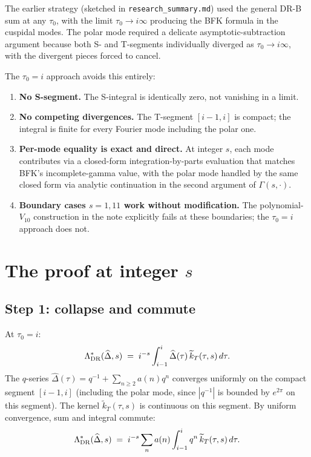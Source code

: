 \documentclass[11pt]{article}
\newcommand{\hatDelta}{\widehat{\Delta}}
\begin{document}
The earlier strategy (sketched in \texttt{research\_summary.md}) used the general DR-B sum at any $\tau_0$, with the limit $\tau_0 \to i\infty$ producing the BFK formula in the cuspidal modes. The polar mode required a delicate asymptotic-subtraction argument because both S- and T-segments individually diverged as $\tau_0 \to i\infty$, with the divergent pieces forced to cancel.

The $\tau_0 = i$ approach avoids this entirely:

\begin{enumerate}
\item \textbf{No S-segment.} The S-integral is identically zero, not vanishing in a limit.
\item \textbf{No competing divergences.} The T-segment $[i-1, i]$ is compact; the integral is finite for every Fourier mode including the polar one.
\item \textbf{Per-mode equality is exact and direct.} At integer $s$, each mode contributes via a closed-form integration-by-parts evaluation that matches BFK's incomplete-gamma value, with the polar mode handled by the same closed form via analytic continuation in the second argument of $\Gamma(s, \cdot)$.
\item \textbf{Boundary cases $s = 1, 11$ work without modification.} The polynomial-$V_{10}$ construction in the note explicitly fails at these boundaries; the $\tau_0 = i$ approach does not.
\end{enumerate}

\section{The proof at integer $s$}

\subsection*{Step 1: collapse and commute}

At $\tau_0 = i$:
\[
\Lambda^*_{\rm DR}(\hatDelta, s) \;=\; i^{-s} \int_{i-1}^{i} \hatDelta(\tau)\, \widetilde{k}_T(\tau, s)\, d\tau.
\]
The $q$-series $\hatDelta(\tau) = q^{-1} + \sum_{n \geq 2} a(n) q^n$ converges uniformly on the compact segment $[i-1, i]$ (including the polar mode, since $|q^{-1}|$ is bounded by $e^{2\pi}$ on this segment). The kernel $\widetilde{k}_T(\tau, s)$ is continuous on this segment. By uniform convergence, sum and integral commute:
\[
\Lambda^*_{\rm DR}(\hatDelta, s) \;=\; i^{-s} \sum_n a(n) \int_{i-1}^{i} q^n\, \widetilde{k}_T(\tau, s)\, d\tau.
\]
\end{document}
